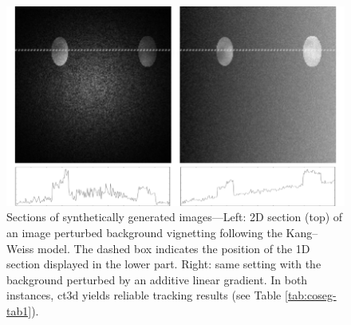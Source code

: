 \begin{figure}[htbp]
\centering
\includegraphics[width=1.0\textwidth]{images/coseg_fig5}
\caption[Sections of synthetically generated images]{Sections of synthetically generated images—Left: 2D section (top) of an image perturbed background vignetting following the Kang–Weiss model\cite{kang2000can}. The dashed box indicates the position of the 1D section displayed in the lower part. Right: same setting with the background perturbed by an additive linear gradient. In both instances, ct3d yields reliable tracking results (see Table \ref{tab:coseg-tab1}).}
\label{fig:coseg-fig5}
\end{figure}

